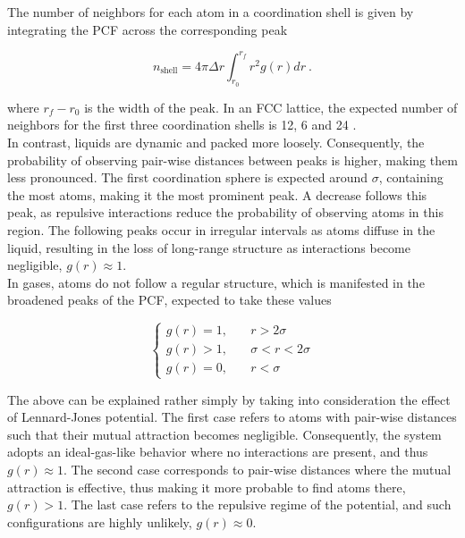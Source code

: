 \documentclass[twocolumn,10pt]{article}
\begin{document}
The number of neighbors for each atom in a coordination shell is given by integrating the PCF across the corresponding peak 

\begin{equation}
      n_{\text{shell}} = 4\pi\Delta r \int_{r_0}^{r_f}r^2g(r) dr \ .
      \label{nshell}
\end{equation}

\noindent where $r_f -r_0$ is the width of the peak. In an FCC lattice, the expected number of neighbors for the first three coordination shells is 12, 6 and 24  \cite{chandler}.\\


In contrast, liquids are dynamic and packed more loosely. Consequently, the probability of observing pair-wise distances between peaks is higher, making them less pronounced. The first coordination sphere is expected around $\sigma$, containing the most atoms, making it the most prominent peak. A decrease follows this peak, as repulsive interactions reduce the probability of observing atoms in this region. The following peaks occur in irregular intervals as atoms diffuse in the liquid, resulting in the loss of long-range structure as interactions become negligible, $g(r) \approx 1$. \\

In gases, atoms do not follow a regular structure, which is manifested in the broadened peaks of the PCF, expected to take these values

\begin{equation}
     \begin{cases}
        g(r) = 1, &\quad r>2\sigma\\
        g(r)>1, &\quad \sigma<r<2\sigma\\
        g(r)=0, &\quad r<\sigma
    \end{cases}
\end{equation}

\noindent The above can be explained rather simply by taking into consideration the effect of Lennard-Jones potential. The first case refers to atoms with pair-wise distances such that their mutual attraction becomes negligible. Consequently, the system adopts an ideal-gas-like behavior where no interactions are present, and thus $g(r)\approx 1$. The second case corresponds to pair-wise distances where the mutual attraction is effective, thus making it more probable to find atoms there, $g(r)>1$. The last case refers to the repulsive regime of the potential, and such configurations are highly unlikely, $g(r)\approx 0$.
 
\end{document}
